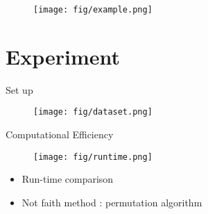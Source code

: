 \documentclass[10pt]{beamer}
\begin{document}
\begin{frame}

    \begin{figure}[h]
        \centering
        \texttt{[image: fig/example.png]}
    \end{figure}
\end{frame}

\section[Experiment]{Experiment}
\begin{frame}{Set up}
    \begin{figure}
        \centering
        \texttt{[image: fig/dataset.png]}
    \end{figure}
\end{frame}
\begin{frame}{Computational Efficiency}
    \begin{figure}
    \centering
    \texttt{[image: fig/runtime.png]}
    \end{figure}
    \begin{itemize}[label=\scalebox{0.5}{$\blacksquare$}]
        \item Run-time comparison
        \item Not faith method : permutation algorithm
    \end{itemize}
\end{frame}
\end{document}
